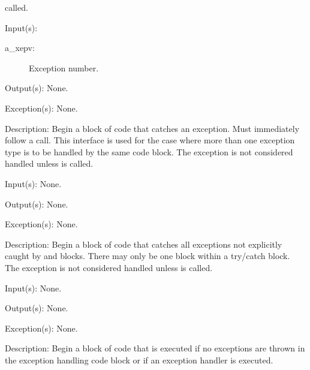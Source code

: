 \begin{capi}
\begin{capilist}
		called.
	\end{capilist}
\label{xep_mcatch}
	\begin{capilist}
	\item[Input(s): ]
		\begin{description}\item[]
		\item[a\_xepv: ]
			Exception number.
		\end{description}
	\item[Output(s): ] None.
	\item[Exception(s): ] None.
	\item[Description: ]
		Begin a block of code that catches an exception.  Must
		immediately follow a  call.  This interface
		is used for the case where more than one exception type is to be
		handled by the same code block.  The exception is not considered
		handled unless  is called.
	\end{capilist}
\label{xep_acatch}
	\begin{capilist}
	\item[Input(s): ] None.
	\item[Output(s): ] None.
	\item[Exception(s): ] None.
	\item[Description: ]
		Begin a block of code that catches all exceptions not explicitly
		caught by  and \cppmacro{xep\_mcatch}{}
		blocks.  There may only be one  block within
		a try/catch block.  The exception is not considered handled
		unless  is called.
	\end{capilist}
\label{xep_finally}
	\begin{capilist}
	\item[Input(s): ] None.
	\item[Output(s): ] None.
	\item[Exception(s): ] None.
	\item[Description: ]
		Begin a block of code that is executed if no exceptions are
		thrown in the exception handling code block or if an exception
		handler is executed.
	\end{capilist}
\label{xep_value}

\end{capi}
